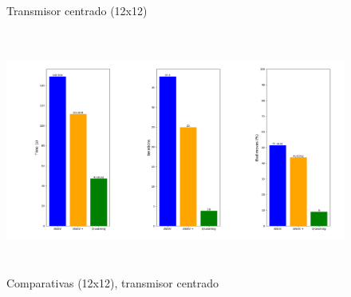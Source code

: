 \begin{figure} [tp]
	\centering
	\quad
	\caption{Transmisor centrado (12x12)}
	\label{fig:map_p_center_12}
\end{figure}

\begin{figure} [tp]
    \begin{center}
    \includegraphics[height=8cm]{imagenes/cap4/18_comp_centro_12.png}
    \end{center}
    \caption[Comparativas (12x12), transmisor centrado]{Comparativas (12x12), transmisor centrado}
    \label{fig:comp_center_12}
\end{figure}

